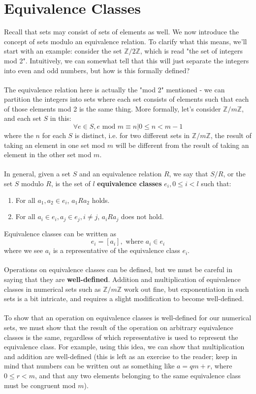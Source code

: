 \documentclass[11pt]{report}
\newcommand{\Z}{\mathbb{Z}}
\begin{document}
\section{Equivalence Classes}
Recall that sets may consist of sets of elements as well. We now introduce the concept of sets modulo an equivalence relation. To clarify what this means, we'll start with an example: consider the set $\Z/2\Z$, which is read "the set of integers mod 2". Intuitively, we can somewhat tell that this will just separate the integers into even and odd numbers, but how is this formally defined? \\ \\
The equivalence relation here is actually the "mod 2" mentioned - we can partition the integers into sets where each set consists of elements such that each of those elements mod 2 is the same thing. More formally, let's consider $\Z/m\Z$, and each set $S$ in this:
$$\forall e \in S, e \text{ mod } m \equiv n | 0 \le n < m - 1$$
where the $n$ for each $S$ is distinct, i.e. for two different sets in $\Z/m\Z$, the result of taking an element in one set mod $m$ will be different from the result of taking an element in the other set mod $m$. \\ \\
In general, given a set $S$ and an equivalence relation $R$, we say that $S/R$, or the set $S$ modulo $R$, is the set of $l$ \textbf{equivalence classes} $e_i, 0 \le i < l$ such that:
\begin{enumerate}
\item For all $a_1, a_2 \in e_i$, $a_1Ra_2$ holds.
\item For all $a_i \in e_i, a_j \in e_j, i \ne j$, $a_iRa_j$ does not hold.
\end{enumerate}
Equivalence classes can be written as 
$$e_i = [a_i], \text{ where } a_i \in e_i$$
where we see $a_i$ is a representative of the equivalence class $e_i$.\\ \\
Operations on equivalence classes can be defined, but we must be careful in saying that they are \textbf{well-defined}. Addition and multiplication of equivalence classes in numerical sets such as $\Z/m\Z$ work out fine, but exponentiation in such sets is a bit intricate, and requires a slight modification to become well-defined. \\ \\ 
To show that an operation on equivalence classes is well-defined for our numerical sets, we must show that the result of the operation on arbitrary equivalence classes is the same, regardless of which representative is used to represent the equivalence class. For example, using this idea, we can show that multiplication and addition are well-defined (this is left as an exercise to the reader; keep in mind that numbers can be written out as something like $a = qm + r$, where $0 \le r < m$, and that any two elements belonging to the same equivalence class must be congruent mod $m$).
\end{document}
